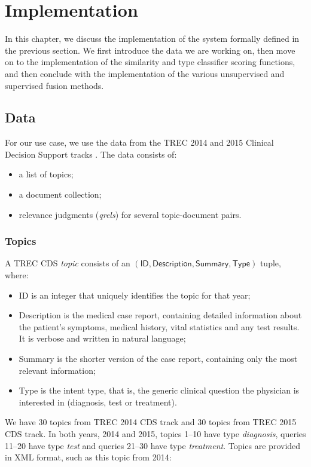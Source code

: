 \chapter{Implementation}\label{impl}

In this chapter, we discuss the implementation of the system formally defined in the previous section. We first
introduce the data we are working on, then move on to the implementation of the similarity and type classifier scoring functions,
and then conclude with the implementation of the various unsupervised and supervised fusion methods.

\section{Data}
For our use case, we use the data from the TREC 2014 and 2015 Clinical Decision Support tracks \cite{trec}. The data consists of:
\begin{itemize}
 \item a list of topics;
 \item a document collection;
 \item relevance judgments (\emph{qrels}) for several topic-document pairs.
\end{itemize}

\subsection{Topics}
A TREC CDS \emph{topic} consists of an $(\textsf{ID}, \textsf{Description}, \textsf{Summary}, \textsf{Type})$ tuple, where:
\begin{itemize}
 \item \textsf{ID} is an integer that uniquely identifies the topic for that year;
 \item \textsf{Description} is the medical case report, containing detailed information about
 the patient's symptoms, medical history, vital statistics and any test results. It is verbose and written in natural language;
 \item \textsf{Summary} is the shorter version of the case report, containing only the most relevant information;
 \item \textsf{Type} is the intent type, that is, the generic clinical question the physician is interested in
  (diagnosis, test or treatment).
\end{itemize}

We have 30 topics from TREC 2014 CDS track and 30 topics from TREC 2015 CDS track.
In both years, 2014 and 2015, topics 1--10 have type \emph{diagnosis}, queries 11--20 have type \emph{test}
and queries 21--30 have type \emph{treatment}.
Topics are provided in XML format, such as this topic from 2014:

